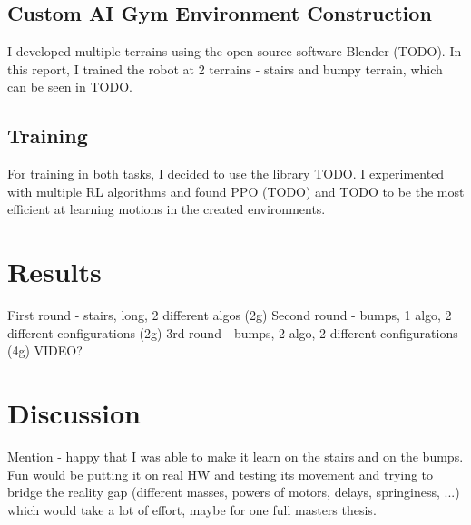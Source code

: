 \documentclass{article}
\begin{document}
\subsection{Custom AI Gym Environment Construction}

I developed multiple terrains using the open-source software Blender (TODO). In this report, I trained the robot at 2 terrains - stairs and bumpy terrain, which can be seen in TODO.
\subsection{Training}
For training in both tasks, I decided to use the library TODO.
I experimented with multiple RL algorithms and found PPO (TODO) and TODO to be the most efficient at learning motions in the created environments.

\section{Results}
First round - stairs, long, 2 different algos (2g)
Second round - bumps, 1 algo, 2 different configurations (2g)
3rd round - bumps, 2 algo, 2 different configurations (4g)
\cite{ppo}
VIDEO?
\section{Discussion}
Mention - happy that I was able to make it learn on the stairs and on the bumps.
Fun would be putting it on real HW and testing its movement and trying to bridge the reality gap (different masses, powers of motors, delays, springiness, ...) which would take a lot of effort, maybe for one full masters thesis.


% 

% 

\end{document}
